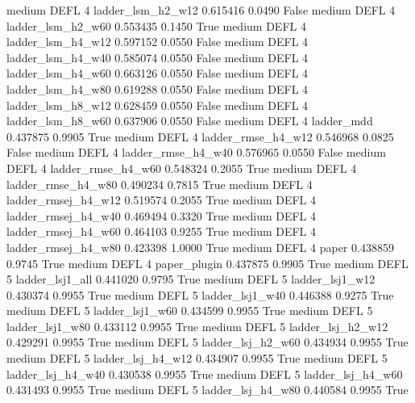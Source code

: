     medium     DEFL                 4   ladder_lsm_h2_w12   0.615416      0.0490   False
    medium     DEFL                 4   ladder_lsm_h2_w60   0.553435      0.1450    True
    medium     DEFL                 4   ladder_lsm_h4_w12   0.597152      0.0550   False
    medium     DEFL                 4   ladder_lsm_h4_w40   0.585074      0.0550   False
    medium     DEFL                 4   ladder_lsm_h4_w60   0.663126      0.0550   False
    medium     DEFL                 4   ladder_lsm_h4_w80   0.619288      0.0550   False
    medium     DEFL                 4   ladder_lsm_h8_w12   0.628459      0.0550   False
    medium     DEFL                 4   ladder_lsm_h8_w60   0.637906      0.0550   False
    medium     DEFL                 4          ladder_mdd   0.437875      0.9905    True
    medium     DEFL                 4  ladder_rmse_h4_w12   0.546968      0.0825   False
    medium     DEFL                 4  ladder_rmse_h4_w40   0.576965      0.0550   False
    medium     DEFL                 4  ladder_rmse_h4_w60   0.548324      0.2055    True
    medium     DEFL                 4  ladder_rmse_h4_w80   0.490234      0.7815    True
    medium     DEFL                 4 ladder_rmsej_h4_w12   0.519574      0.2055    True
    medium     DEFL                 4 ladder_rmsej_h4_w40   0.469494      0.3320    True
    medium     DEFL                 4 ladder_rmsej_h4_w60   0.464103      0.9255    True
    medium     DEFL                 4 ladder_rmsej_h4_w80   0.423398      1.0000    True
    medium     DEFL                 4               paper   0.438859      0.9745    True
    medium     DEFL                 4        paper_plugin   0.437875      0.9905    True
    medium     DEFL                 5     ladder_lsj1_all   0.441020      0.9795    True
    medium     DEFL                 5     ladder_lsj1_w12   0.430374      0.9955    True
    medium     DEFL                 5     ladder_lsj1_w40   0.446388      0.9275    True
    medium     DEFL                 5     ladder_lsj1_w60   0.434599      0.9955    True
    medium     DEFL                 5     ladder_lsj1_w80   0.433112      0.9955    True
    medium     DEFL                 5   ladder_lsj_h2_w12   0.429291      0.9955    True
    medium     DEFL                 5   ladder_lsj_h2_w60   0.434934      0.9955    True
    medium     DEFL                 5   ladder_lsj_h4_w12   0.434907      0.9955    True
    medium     DEFL                 5   ladder_lsj_h4_w40   0.430538      0.9955    True
    medium     DEFL                 5   ladder_lsj_h4_w60   0.431493      0.9955    True
    medium     DEFL                 5   ladder_lsj_h4_w80   0.440584      0.9955    True
